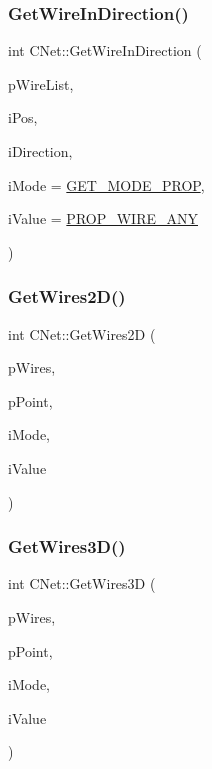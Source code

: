 \mbox{\label{classCNet_a390a24e0f9ac1ac082746d09ebb35d23}} 
\subsubsection{\texorpdfstring{GetWireInDirection()}{GetWireInDirection()}}
{\footnotesize\ttfamily int C\+Net\+::\+Get\+Wire\+In\+Direction (\begin{DoxyParamCaption}\item[{vector$<$ \mbox{\hyperlink{classCWire}{C\+Wire}} $\ast$ $>$ $\ast$}]{p\+Wire\+List,  }\item[{int}]{i\+Pos,  }\item[{int}]{i\+Direction,  }\item[{int}]{i\+Mode = {\ttfamily \mbox{\hyperlink{BoxRouter_8h_a678c4c2628bee05b15999bb00ded44d3}{G\+E\+T\+\_\+\+M\+O\+D\+E\+\_\+\+P\+R\+OP}}},  }\item[{int}]{i\+Value = {\ttfamily \mbox{\hyperlink{BoxRouter_8h_a3190814b5494277cd30ff3d03c8d4058}{P\+R\+O\+P\+\_\+\+W\+I\+R\+E\+\_\+\+A\+NY}}} }\end{DoxyParamCaption})}

\mbox{\label{classCNet_aa70dfc4170e25b64e56a85ef95691b86}} 
\subsubsection{\texorpdfstring{GetWires2D()}{GetWires2D()}}
{\footnotesize\ttfamily int C\+Net\+::\+Get\+Wires2D (\begin{DoxyParamCaption}\item[{vector$<$ \mbox{\hyperlink{classCWire}{C\+Wire}} $\ast$ $>$ $\ast$}]{p\+Wires,  }\item[{\mbox{\hyperlink{classCPoint}{C\+Point}} $\ast$}]{p\+Point,  }\item[{int}]{i\+Mode,  }\item[{int}]{i\+Value }\end{DoxyParamCaption})}

\mbox{\label{classCNet_a8c0924224990fa0de1c90a8d94c046e0}} 
\subsubsection{\texorpdfstring{GetWires3D()}{GetWires3D()}}
{\footnotesize\ttfamily int C\+Net\+::\+Get\+Wires3D (\begin{DoxyParamCaption}\item[{vector$<$ \mbox{\hyperlink{classCWire}{C\+Wire}} $\ast$ $>$ $\ast$}]{p\+Wires,  }\item[{\mbox{\hyperlink{classCPoint}{C\+Point}} $\ast$}]{p\+Point,  }\item[{int}]{i\+Mode,  }\item[{int}]{i\+Value }\end{DoxyParamCaption})}

